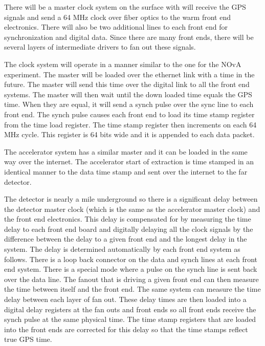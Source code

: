 There will be a master clock system on the surface with will receive
the GPS signals and send a 64 MHz clock over fiber optics to the warm
front end electronics. There will also be two additional lines to each
front end for synchronization and digital data.  Since there are many
front ends, there will be several layers of intermediate drivers to
fan out these signals.

The clock system will operate in a manner similar to the one for the
NOvA experiment.  The master will be loaded over the ethernet link
with a time in the future.  The master will send this time over the
digital link to all the front end systems.  The master will then wait
until the down loaded time equals the GPS time.  When they are equal,
it will send a synch pulse over the sync line to each front end.  The
synch pulse causes each front end to load its time stamp register from
the time load register.  The time stamp register then increments on
each 64 MHz cycle.  This register is 64 bits wide and it is appended
to each data packet.

The accelerator system has a similar master and it can be loaded in
the same way over the internet.  The accelerator start of extraction
is time stamped in an identical manner to the data time stamp and sent
over the internet to the far detector.

The detector is nearly a mile underground so there is a significant
delay between the detector master clock (which is the same as the
accelerator master clock) and the front end electronics.  This delay
is compensated for by measuring the time delay to each front end board
and digitally delaying all the clock signals by the difference between
the delay to a given front end and the longest delay in the system.
The delay is determined automatically by each front end system as
follows.  There is a loop back connector on the data and synch lines
at each front end system.  There is a special mode where a pulse on
the synch line is sent back over the data line.  The fanout that is
driving a given front end can then measure the time between itself and
the front end.  The same system can measure the time delay between
each layer of fan out.  These delay times are then loaded into a
digital delay registers at the fan outs and front ends so all front
ends receive the synch pulse at the same physical time.  The time
stamp registers that are loaded into the front ends are corrected for
this delay so that the time stamps reflect true GPS time.

